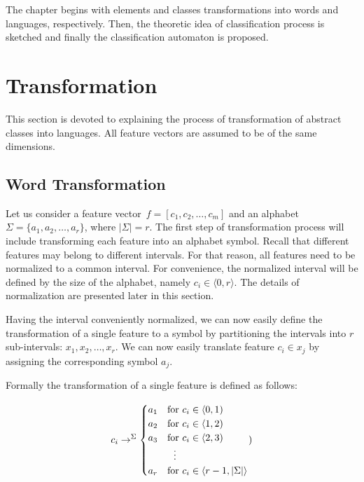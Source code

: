 \documentclass{mini}
\begin{document}
The chapter begins with elements and classes transformations into words and languages, respectively. Then, the theoretic idea of classification process is sketched and finally the classification automaton is proposed.

\section{Transformation}\label{sec:lan_theory_transf}
This section is devoted to explaining the process of transformation of abstract classes into languages. All feature vectors are assumed to be of the same dimensions.

\subsection{Word Transformation}\label{sec:lan_theory_transf_word}

Let us consider a feature vector~$f = [c_{1},c_{2},\ldots,c_{m}]$ and an alphabet $\Sigma=\{a_{1}, a_{2}, \ldots, a_{r} \}$, where $|\Sigma|=r$.
The first step of transformation process will include transforming each feature into an alphabet symbol. Recall that different features may belong to different intervals. For that reason, all features need to be normalized to a common interval. For convenience, the normalized interval will be defined by the size of the alphabet, namely $c_{i} \in \langle 0 , r \rangle$. The details of normalization are presented later in this section.

Having the interval conveniently normalized, we can now easily define the transformation of a single feature to a symbol by partitioning the intervals into $r$ sub-intervals: $x_1, x_2,\ldots,x_r$. We can now easily translate feature $c_i \in x_{j}$ by assigning the corresponding symbol $a_{j}$.

Formally the transformation of a single feature is defined as follows:

\begin{equation*}
c_i \featureTransformationSymbol{\Sigma}
\begin{cases}
a_1 & \text{for } c_{i} \in  \langle 0 , 1) \\
a_2 & \text{for } c_{i} \in  \langle 1 , 2) \\
a_3 & \text{for } c_{i} \in  \langle 2 , 3) \\
&\makebox[\widthof{${}\rightarrow{}$}][c]{\vdots} \\
a_{r} & \text{for } c_{i} \in \langle r -1, |\Sigma|  \rangle
\end{cases})
\end{equation*}
\end{document}
